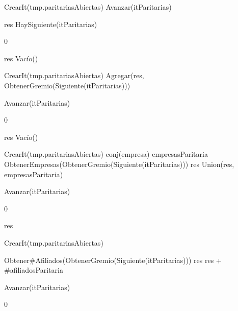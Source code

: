 {
	\state {} \asig CrearIt(tmp.paritariasAbiertas)		
			
		\state
		\state Avanzar(itParitarias)				
	\endwhile
	\state

	\state res \asig HaySiguiente(itParitarias)		
}
{0}
{\addtocounter{lipsumcounter}{1}}

{
	\state res \asig Vacío()		
	\state

	\state {} \asig CrearIt(tmp.paritariasAbiertas)		
											
		\state
		\state Agregar(res, ObtenerGremio(Siguiente(itParitarias)))		
		
		\state
		\state Avanzar(itParitarias)										
	\endwhile
}
{0}
{\addtocounter{lipsumcounter}{1}}

{
	\state res \asig Vacío()		
	\state

	\state {} \asig CrearIt(tmp.paritariasAbiertas)		
							
		\state
		\state conj(empresa) empresasParitaria \asig ObtenerEmpresas(ObtenerGremio(Siguiente(itParitarias)))		
		\state res \asig Union(res, empresasParitaria)		

		\state
		\state Avanzar(itParitarias)						
	\endwhile
}
{0}
{\addtocounter{lipsumcounter}{1}}

{
	\state res 		
	\state

	\state {} \asig CrearIt(tmp.paritariasAbiertas)		
						
		\state

		\state {} \asig Obtener\#Afiliados(ObtenerGremio(Siguiente(itParitarias)))		
		\state res \asig res + \#afiliadosParitaria		

		\state
		\state Avanzar(itParitarias)					
	\endwhile
}
{0}
{\addtocounter{lipsumcounter}{1}}

